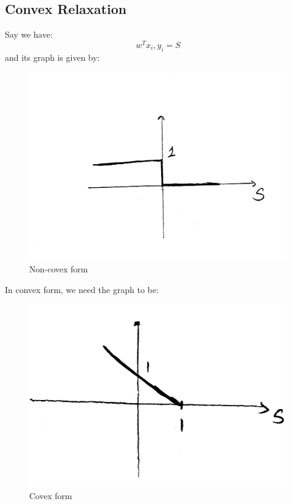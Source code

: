\documentclass[twoside]{article}
\theoremstyle{definition}
\theoremstyle{definition}
\theoremstyle{remark}
\begin{document}
\subsection{Convex Relaxation}
Say we have:
\[ w^T x_i, y_i =S\]
and its graph is given by:\\
\begin{figure}[H]
\centering
\includegraphics[width=120mm]{Non-covex.jpg}
\caption{ Non-covex form }
\end{figure}

In convex form, we need the graph to be:\\
\begin{figure}[H]
\centering
\includegraphics[width=120mm]{covex.jpg}
\caption{ Covex form}
\end{figure}
\end{document}
